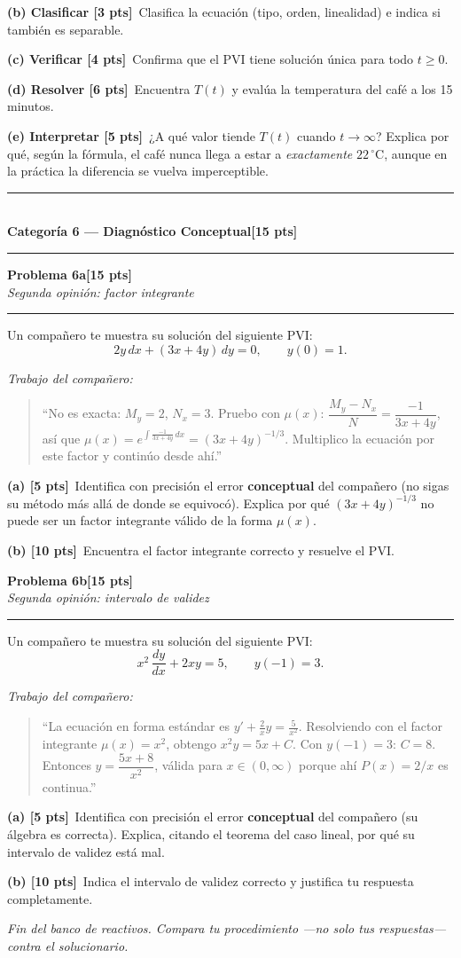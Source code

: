 \documentclass[11pt,letterpaper]{article}
\newcommand{\categoria}[3]{%
  \bigskip\bigskip\noindent
  \rule{\linewidth}{0.8pt}\\[2pt]
  {\Large\bfseries Categoría #1 --- #2}\hfill\textbf{[#3 pts]}\\[2pt]
  \rule{\linewidth}{0.8pt}\vspace{4pt}
}
\newcommand{\problema}[3]{%
  \bigskip\noindent
  {\large\textbf{Problema #1}}\hfill\textbf{[#2 pts]}\\[3pt]
  {\small\itshape #3}\par
  \vspace{2pt}\hrule\vspace{8pt}
}
\newcommand{\subparte}[2]{%
  \medskip\noindent\textbf{(#1}\ #2\par
}
\begin{document}
\subparte{b) Clasificar [3 pts]}{Clasifica la ecuación (tipo, orden, linealidad) e indica si también es separable.}

\subparte{c) Verificar [4 pts]}{Confirma que el PVI tiene solución única para todo $t\ge0$.}

\subparte{d) Resolver [6 pts]}{Encuentra $T(t)$ y evalúa la temperatura del café a los 15 minutos.}

\subparte{e) Interpretar [5 pts]}{¿A qué valor tiende $T(t)$ cuando $t\to\infty$? Explica por qué, según la fórmula, el café nunca llega a estar a \emph{exactamente} $22\,^\circ\text{C}$, aunque en la práctica la diferencia se vuelva imperceptible.}

\newpage
\categoria{6}{Diagnóstico Conceptual}{15}

\problema{6a}{15}{Segunda opinión: factor integrante}

Un compañero te muestra su solución del siguiente PVI:
\[
2y\,dx + (3x+4y)\,dy = 0, \qquad y(0)=1.
\]

\textit{Trabajo del compañero:}
\begin{quote}
\small
``No es exacta: $M_y=2$, $N_x=3$. Pruebo con $\mu(x)$: $\dfrac{M_y-N_x}{N} = \dfrac{-1}{3x+4y}$, así que $\mu(x) = e^{\int \frac{-1}{3x+4y}\,dx} = (3x+4y)^{-1/3}$. Multiplico la ecuación por este factor y continúo desde ahí.''
\end{quote}

\subparte{a) [5 pts]}{Identifica con precisión el error \textbf{conceptual} del compañero (no sigas su método más allá de donde se equivocó). Explica por qué $(3x+4y)^{-1/3}$ no puede ser un factor integrante válido de la forma $\mu(x)$.}

\subparte{b) [10 pts]}{Encuentra el factor integrante correcto y resuelve el PVI.}

\problema{6b}{15}{Segunda opinión: intervalo de validez}

Un compañero te muestra su solución del siguiente PVI:
\[
x^2\,\frac{dy}{dx} + 2xy = 5, \qquad y(-1)=3.
\]

\textit{Trabajo del compañero:}
\begin{quote}
\small
``La ecuación en forma estándar es $y' + \frac{2}{x}y = \frac{5}{x^2}$. Resolviendo con el factor integrante $\mu(x)=x^2$, obtengo $x^2y = 5x+C$. Con $y(-1)=3$: $C=8$. Entonces $y = \dfrac{5x+8}{x^2}$, válida para $x \in (0,\infty)$ porque ahí $P(x)=2/x$ es continua.''
\end{quote}

\subparte{a) [5 pts]}{Identifica con precisión el error \textbf{conceptual} del compañero (su álgebra es correcta). Explica, citando el teorema del caso lineal, por qué su intervalo de validez está mal.}

\subparte{b) [10 pts]}{Indica el intervalo de validez correcto y justifica tu respuesta completamente.}

\vfill
\begin{center}\small\textit{Fin del banco de reactivos. Compara tu procedimiento —no solo tus respuestas— contra el solucionario.}\end{center}
\end{document}
